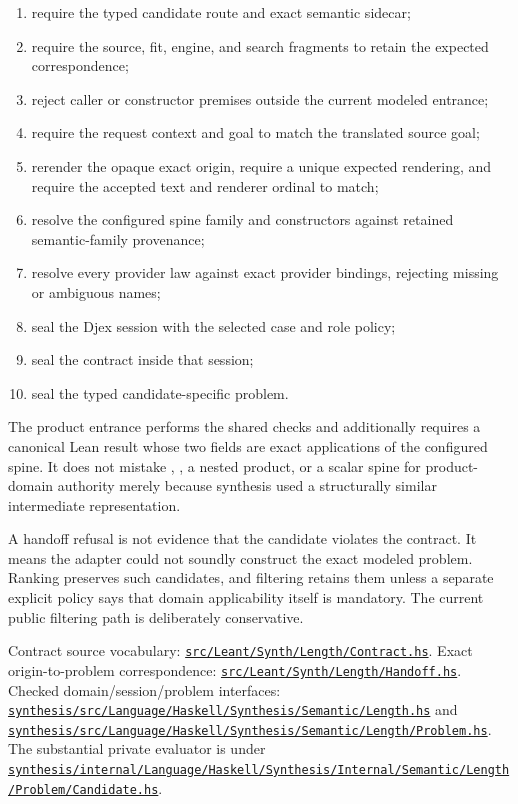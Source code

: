 \documentclass[10pt,letterpaper,oneside]{report}
\newcommand{\code}[1]{\texttt{\detokenize{#1}}}
\def\LeantCommit{494259dbd85ae2e6749246b08377f44b2f9936ac}
\def\DjexPinnedCommit{7d65eba6f753727ae7b3d734fb4a7e00f1f44aa7}
\def\LeantBase{https://github.com/VladimirReshetnikov/Leant/blob/\LeantCommit/}
\def\DjexBase{https://github.com/VladimirReshetnikov/Djex/blob/\DjexPinnedCommit/}
\newcommand{\lpath}[1]{\href{\LeantBase#1}{\nolinkurl{#1}}}
\newcommand{\dpath}[1]{\href{\DjexBase#1}{\nolinkurl{#1}}}
\begin{document}
\begin{enumerate}
\item require the typed candidate route and exact semantic sidecar;
\item require the source, fit, engine, and search fragments to retain the expected correspondence;
\item reject caller or constructor premises outside the current modeled entrance;
\item require the request context and goal to match the translated source goal;
\item rerender the opaque exact origin, require a unique expected rendering, and require the accepted text and renderer ordinal to match;
\item resolve the configured spine family and constructors against retained semantic-family provenance;
\item resolve every provider law against exact provider bindings, rejecting missing or ambiguous names;
\item seal the Djex session with the selected case and role policy;
\item seal the contract inside that session;
\item seal the typed candidate-specific problem.
\end{enumerate}

The product entrance performs the shared checks and additionally requires a canonical Lean \code{Prod} result whose two fields are exact applications of the configured spine. It does not mistake \code{And}, \code{PProd}, a nested product, or a scalar spine for product-domain authority merely because synthesis used a structurally similar intermediate representation.

\begin{pitfall}
A handoff refusal is not evidence that the candidate violates the contract. It means the adapter could not soundly construct the exact modeled problem. Ranking preserves such candidates, and filtering retains them unless a separate explicit policy says that domain applicability itself is mandatory. The current public filtering path is deliberately conservative.
\end{pitfall}

\begin{sourcebox}
Contract source vocabulary: \lpath{src/Leant/Synth/Length/Contract.hs}. Exact origin-to-problem correspondence: \lpath{src/Leant/Synth/Length/Handoff.hs}. Checked domain/session/problem interfaces: \dpath{synthesis/src/Language/Haskell/Synthesis/Semantic/Length.hs} and \dpath{synthesis/src/Language/Haskell/Synthesis/Semantic/Length/Problem.hs}. The substantial private evaluator is under \dpath{synthesis/internal/Language/Haskell/Synthesis/Internal/Semantic/Length/Problem/Candidate.hs}.
\end{sourcebox}
\end{document}
